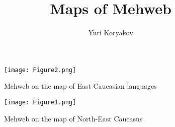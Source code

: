 ﻿\documentclass[output=paper]{langsci/langscibook}
\title{Maps of Mehweb}
\author{Yuri Koryakov\affiliation{Institute of Linguistics RAS}}
\begin{document}
\maketitle


\begin{figure}[h]
\texttt{[image: Figure2.png]}

\caption{Mehweb on the map of East Caucasian languages}
\end{figure}

\clearpage


\begin{figure}
\texttt{[image: Figure1.png]}
  
\caption{Mehweb on the map of North-East Caucasus}
\end{figure}
\end{document}
